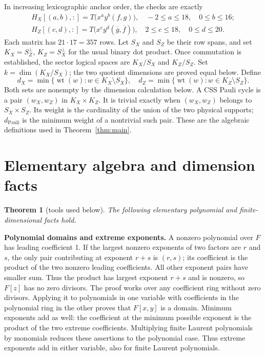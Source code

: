 \documentclass{article}
\newtheorem{theorem}{Theorem}
\DeclareMathOperator{\wt}{wt}
\begin{document}
In increasing lexicographic anchor order, the checks are exactly
\begin{gather}
  H_X[(a,b), {:}] = T\bigl(x^a y^b (f, g)\bigr),
  \quad -2 \le a \le 18, \quad 0 \le b \le 16; \\
  H_Z[(c,d), {:}] = T\bigl(x^c y^d (\overline{g}, \overline{f})\bigr),
  \quad 2 \le c \le 18, \quad 0 \le d \le 20.
\end{gather}
Each matrix has \(21 \cdot 17 = 357\) rows. Let \(S_X\) and \(S_Z\) be their row spans, and
set \(K_X = S_Z^{\perp}\), \(K_Z = S_X^{\perp}\) for the usual binary dot product. Once
commutation is established, the sector logical spaces are \(K_X/S_X\) and \(K_Z/S_Z\). Set
\(k = \dim(K_X/S_X)\); the two quotient dimensions are proved equal below. Define
\begin{equation}
  d_X = \min\{\wt(w) : w \in K_X \setminus S_X\}, \quad
  d_Z = \min\{\wt(w) : w \in K_Z \setminus S_Z\}.
\end{equation}
Both sets are nonempty by the dimension calculation below. A CSS Pauli cycle is a pair
\((w_X, w_Z)\) in \(K_X \times K_Z\). It is trivial exactly when \((w_X, w_Z)\) belongs to
\(S_X \times S_Z\). Its weight is the cardinality of the union of the two physical supports;
\(d_{\text{Pauli}}\) is the minimum weight of a nontrivial such pair. These are the algebraic
definitions used in Theorem~\ref{thm:main}.

\section{Elementary algebra and dimension facts}\label{sec:tools}

\begin{theorem}[tools used below]\label{thm:tools}
  The following elementary polynomial and finite-dimensional facts hold.
\end{theorem}

\textbf{Polynomial domains and extreme exponents.} A nonzero polynomial over \(F\) has
leading coefficient 1. If the largest nonzero exponents of two factors are \(r\) and \(s\),
the only pair contributing at exponent \(r + s\) is \((r, s)\); its coefficient is the
product of the two nonzero leading coefficients. All other exponent pairs have smaller sum.
Thus the product has largest exponent \(r + s\) and is nonzero, so \(F[z]\) has no zero
divisors. The proof works over any coefficient ring without zero divisors. Applying it to
polynomials in one variable with coefficients in the polynomial ring in the other proves that
\(F[x,y]\) is a domain. Minimum exponents add as well: the coefficient at the minimum possible
exponent is the product of the two extreme coefficients. Multiplying finite Laurent
polynomials by monomials reduces these assertions to the polynomial case. Thus extreme
exponents add in either variable, also for finite Laurent polynomials.
\end{document}
